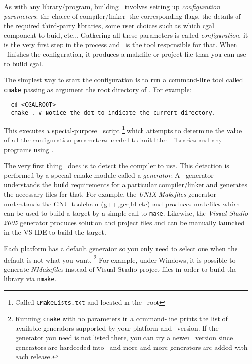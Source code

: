 As with any library/program, building \cgal\ involves setting up {\em configuration parameters}:
the choice of compiler/linker, the corresponding flags, the details of the required third-party libraries,
some user choices such as which cgal component to buid, etc... Gathering all these parameters is called
{\em configuration}, it is the very first step in the process and \cmake\ is the tool responsible for that. 
When \cmake\ finishes the configuration, it produces a makefile or project file than you can use to build cgal.

The simplest way to start the configuration is to run a command-line tool called \texttt{cmake} passing 
as argument the root directory of \cgal. For example:

{\ccTexHtml{\scriptsize}{}
\begin{verbatim}
  cd <CGALROOT>
  cmake . # Notice the dot to indicate the current directory.
\end{verbatim}
}

This executes a special-purpose \cmake\ script
\footnote{Called \texttt{CMakeLists.txt} and located in the \cgal\ root} 
which attempts to determine the value of all the configuration parameters needed to build the \cgal\
libraries and any programs using \cgal. 

The very first thing \cmake\ does is to detect the compiler to use.
This detection is performed by a special cmake module called a {\em generator}. A
\cmake\ generator understands the build requirements for a particular compiler/linker
 and generates the necessary files for that. For example, the 
{\em UNIX Makefiles} generator understands the GNU toolchain (g++,gcc,ld etc) and produces makefiles
which can be used to build a target by a simple call to \texttt{make}.
Likewise, the {\em Visual Studio 2005} generator produces solution and project files and can be manually
launched in the VS IDE to build the target.

Each platform has a default generator so you only need to select one when the default is
not what you want. 
\footnote{Running \texttt{cmake} with no parameters in a command-line prints the list of available generators supported 
by your platform and \cmake\ version. If the generator you need is not listed there, you can
try a newer \cmake\ version since generators are hardcoded into \cmake\ and more and
more generators are added with each release.}
For example, under Windows, it is possible to generate {\em NMakefiles}
instead of Visual Studio project files in order to build the library via \texttt{nmake}.

